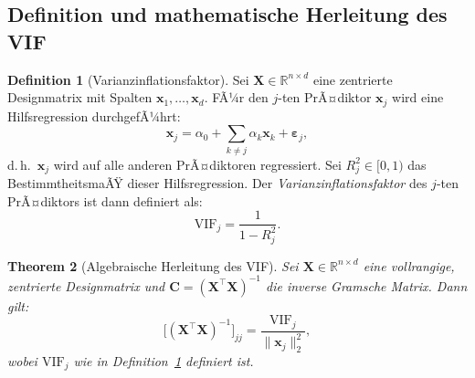 ﻿\documentclass[12pt, a4paper]{article}
\newtheorem{theorem}{Theorem}[section]
\theoremstyle{definition}
\newtheorem{definition}[theorem]{Definition}
\theoremstyle{remark}
\newcommand{\R}{\mathbb{R}}
\newcommand{\vx}{\bm{x}}
\newcommand{\vX}{\bm{X}}
\newcommand{\T}{\top}
\begin{document}
\subsection{Definition und mathematische Herleitung des VIF}

\begin{definition}[Varianzinflationsfaktor]
	\label{def:vif}
	Sei $\vX \in \R^{n \times d}$ eine zentrierte Designmatrix mit Spalten $\vx_1, \ldots, \vx_d$.
	FÃ¼r den $j$-ten PrÃ¤diktor $\vx_j$ wird eine Hilfsregression durchgefÃ¼hrt:
	\[
	\vx_j = \alpha_0 + \sum_{k \neq j} \alpha_k \vx_k + \bm{\varepsilon}_j,
	\]
	d.\,h.\ $\vx_j$ wird auf alle anderen PrÃ¤diktoren regressiert. Sei $R_j^2 \in [0,1)$ das
	BestimmtheitsmaÃŸ dieser Hilfsregression. Der \emph{Varianzinflationsfaktor} des $j$-ten
	PrÃ¤diktors ist dann definiert als:
	\begin{equation}
		\boxed{\mathrm{VIF}_j = \frac{1}{1 - R_j^2}.}
		\label{eq:vif_def}
	\end{equation}
\end{definition}

\begin{theorem}[Algebraische Herleitung des VIF]
	\label{thm:vif_derivation}
	Sei $\vX \in \R^{n \times d}$ eine vollrangige, zentrierte Designmatrix und
	$\bm{C} = (\vX^\T\vX)^{-1}$ die inverse Gramsche Matrix. Dann gilt:
	\begin{equation}
		\bigl[(\vX^\T\vX)^{-1}\bigr]_{jj} = \frac{\mathrm{VIF}_j}{\|\vx_j\|_2^2},
		\label{eq:vif_algebraic}
	\end{equation}
	wobei $\mathrm{VIF}_j$ wie in Definition~\ref{def:vif} definiert ist.
\end{theorem}
\end{document}
